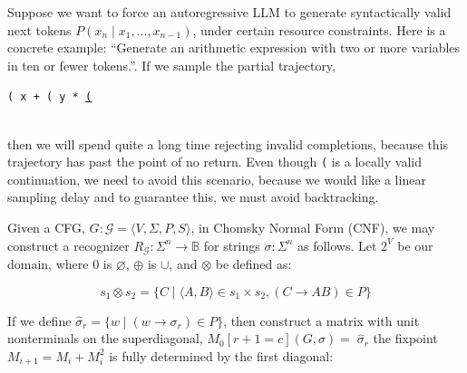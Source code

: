 \documentclass[portrait,a0b,final,a4resizeable]{a0poster}
\def\jointspacing{\vspace{0.3in}}
\begin{document}
\begin{poster}
\begin{multicols}{2}
\jointspacing

\null\hspace*{3cm}\begin{minipage}[c]{0.85\columnwidth}
Suppose we want to force an autoregressive LLM to generate syntactically valid next tokens $P(x_n \mid x_1, \ldots, x_{n-1})$, under certain resource constraints. Here is a concrete example: ``Generate an arithmetic expression with two or more variables in ten or fewer tokens.''. If we sample the partial trajectory,
\begin{center}\texttt{( x + ( y * }\underline{\texttt{(}}\end{center}\\
then we will spend quite a long time rejecting invalid completions, because this trajectory has past the point of no return. Even though \texttt{(} is a locally valid continuation, we need to avoid this scenario, because we would like a linear sampling delay and to guarantee this, we must avoid backtracking.
\end{minipage}

      \jointspacing

      \null\hspace*{3cm}\begin{minipage}[c]{0.85\columnwidth}
          Given a CFG, $G: \mathcal{G} = \langle V, \Sigma, P, S\rangle$, in Chomsky Normal Form (CNF), we may construct a recognizer $R_\mathcal{G}: \Sigma^n \rightarrow \mathbb{B}$ for strings $\sigma: \Sigma^n$ as follows. Let $2^V$ be our domain, where $0$ is $\varnothing$, $\oplus$ is $\cup$, and $\otimes$ be defined as:\vspace{1cm}
      \end{minipage}

      \[
        s_1 \otimes s_2 = \{C \mid \langle A, B\rangle \in s_1 \times s_2, (C\rightarrow AB) \in P\}
      \]

      \null\hspace*{3cm}\begin{minipage}[c]{0.85\columnwidth}
If we define $\hat\sigma_r = \{w \mid (w \rightarrow \sigma_r) \in P\}$, then construct a matrix with unit nonterminals on the superdiagonal, $M_0[r+1=c](G, \sigma) = \;\hat\sigma_r$ the fixpoint $M_{i+1} = M_i + M_i^2$ is fully determined by the first diagonal:\vspace{0.5cm}
\end{minipage}


\end{multicols}
\end{poster}
\end{document}
